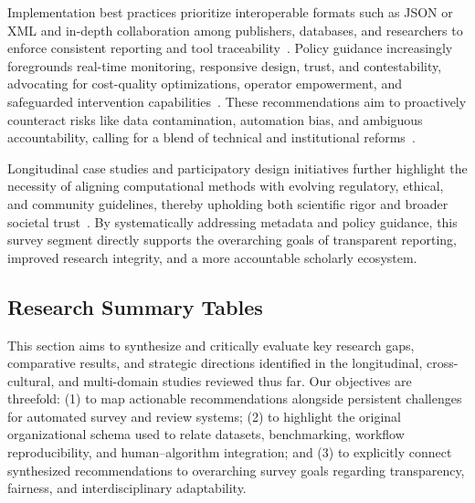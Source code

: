 \documentclass[sigconf]{acmart}
\begin{document}
Implementation best practices prioritize interoperable formats such as JSON or XML and in-depth collaboration among publishers, databases, and researchers to enforce consistent reporting and tool traceability~\cite{ref106}\cite{ref117}. Policy guidance increasingly foregrounds real-time monitoring, responsive design, trust, and contestability, advocating for cost-quality optimizations, operator empowerment, and safeguarded intervention capabilities~\cite{ref111}. These recommendations aim to proactively counteract risks like data contamination, automation bias, and ambiguous accountability, calling for a blend of technical and institutional reforms~\cite{ref111}\cite{ref117}.

Longitudinal case studies and participatory design initiatives further highlight the necessity of aligning computational methods with evolving regulatory, ethical, and community guidelines, thereby upholding both scientific rigor and broader societal trust~\cite{ref106}\cite{ref111}\cite{ref117}. By systematically addressing metadata and policy guidance, this survey segment directly supports the overarching goals of transparent reporting, improved research integrity, and a more accountable scholarly ecosystem.

\subsection{Research Summary Tables}

This section aims to synthesize and critically evaluate key research gaps, comparative results, and strategic directions identified in the longitudinal, cross-cultural, and multi-domain studies reviewed thus far. Our objectives are threefold: (1) to map actionable recommendations alongside persistent challenges for automated survey and review systems; (2) to highlight the original organizational schema used to relate datasets, benchmarking, workflow reproducibility, and human–algorithm integration; and (3) to explicitly connect synthesized recommendations to overarching survey goals regarding transparency, fairness, and interdisciplinary adaptability.
\end{document}
